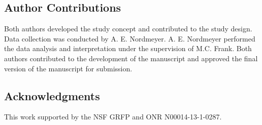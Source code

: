 \documentclass[man, noapacite]{apa2}
\begin{document}
\subsection{Author Contributions}
Both authors developed the study concept and contributed to the study design.  Data collection was conducted by A. E. Nordmeyer.  A. E. Nordmeyer performed the data analysis and interpretation under the supervision of M.C. Frank.  Both authors contributed to the development of the manuscript and approved the final version of the manuscript for submission.

\subsection{Acknowledgments}
This work supported by the NSF GRFP and ONR N00014-13-1-0287.





\end{document}
